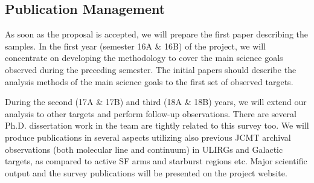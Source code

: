 \documentclass[legal,11pt]{article}
\begin{document}
\subsection{Publication Management} 

As soon as the proposal is accepted, we will prepare the first paper describing
the samples. In the first year (semester 16A \& 16B) of the project, we will
concentrate on developing the methodology to cover the main science goals
observed during the preceding semester. The initial papers should describe the
analysis methods of the main science goals to the first set of observed
targets.  

During the second (17A \& 17B) and third (18A \& 18B) years, we will extend our
analysis to other targets and perform follow-up observations. There are several
Ph.D. dissertation work in the team are tightly related to this survey too. We
will produce publications in several aspects utilizing also previous JCMT
archival observations (both molecular line and continuum) in ULIRGs and
Galactic targets, as compared to active SF arms and starburst regions etc. 
Major scientific output and the survey publications will be presented on the
project website. 



\setlength{\bibsep}{0pt}
\begin{multicols}{2}

{\footnotesize
{}
}
\end{multicols}


\end{document}
